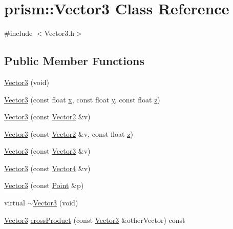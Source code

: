 \hypertarget{classprism_1_1_vector3}{}\section{prism\+:\+:Vector3 Class Reference}
\label{classprism_1_1_vector3}


{\ttfamily \#include $<$Vector3.\+h$>$}

\subsection*{Public Member Functions}
\begin{DoxyCompactItemize}
\item 
\hyperlink{classprism_1_1_vector3_a4c8a967a3ad35433d940835da86951be}{Vector3} (void)
\item 
\hyperlink{classprism_1_1_vector3_a5a9ce22b6f76fa0b19b0f2a452120ebe}{Vector3} (const float \hyperlink{classprism_1_1_vector3_a6cd6b0776fc0eae2068f2610b882bb9f}{x}, const float \hyperlink{classprism_1_1_vector3_ad1e152047e314b334b4ccb5ab665640c}{y}, const float \hyperlink{classprism_1_1_vector3_af760dbfa2ae9747794f1a542395306b8}{z})
\item 
\hyperlink{classprism_1_1_vector3_a478e2dba2c1bd6cb5d319e293d76bd74}{Vector3} (const \hyperlink{classprism_1_1_vector2}{Vector2} \&v)
\item 
\hyperlink{classprism_1_1_vector3_ad0b141f676e38dfb7f28a5d36d38e028}{Vector3} (const \hyperlink{classprism_1_1_vector2}{Vector2} \&v, const float \hyperlink{classprism_1_1_vector3_af760dbfa2ae9747794f1a542395306b8}{z})
\item 
\hyperlink{classprism_1_1_vector3_ac01c271a781d04df0bd834c50a0f3cfa}{Vector3} (const \hyperlink{classprism_1_1_vector3}{Vector3} \&v)
\item 
\hyperlink{classprism_1_1_vector3_a69128dd0e0c36e12eae1c7bea75a8729}{Vector3} (const \hyperlink{classprism_1_1_vector4}{Vector4} \&v)
\item 
\hyperlink{classprism_1_1_vector3_a0ca9ab8904b692b589173f485c7f6b7f}{Vector3} (const \hyperlink{classprism_1_1_point}{Point} \&p)
\item 
virtual \hyperlink{classprism_1_1_vector3_a9e69f02268e199bb83eeb473e4173d3c}{$\sim$\+Vector3} (void)
\item 
\hyperlink{classprism_1_1_vector3}{Vector3} \hyperlink{classprism_1_1_vector3_a1d921241365dbcd6d97ff3f048303774}{cross\+Product} (const \hyperlink{classprism_1_1_vector3}{Vector3} \&other\+Vector) const 

\end{DoxyCompactItemize}
